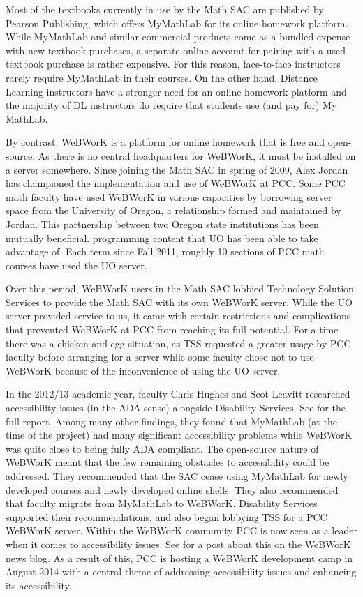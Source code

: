 Most of the textbooks currently in use by the Math SAC are published by Pearson
Publishing, which offers MyMathLab for its online homework platform. While
MyMathLab and similar commercial products come as a bundled expense with new
textbook purchases, a separate online account for pairing with a used textbook
purchase is rather expensive. For this reason, face-to-face instructors rarely
require MyMathLab in their courses. On the other hand, Distance Learning
instructors have a stronger need for an online homework platform and the
majority of DL instructors do require that students use (and pay for) My
MathLab.

By contrast, WeBWorK is a platform for online homework that is free and
open-source. As there is no central headquarters for WeBWorK, it must be
installed on a server somewhere. Since joining the Math SAC in spring of 2009,
Alex Jordan has championed the implementation and use of WeBWorK at PCC. Some
PCC math faculty have used WeBWorK in various capacities by borrowing server
space from the University of Oregon, a relationship formed and maintained by
Jordan. This partnership between two Oregon state institutions has been
mutually beneficial. %
programming content that UO has been able to take advantage of. Each term since
Fall 2011, roughly 10 sections of PCC math courses have used the UO server.

Over this period, WeBWorK users in the Math SAC lobbied Technology Solution
Services to provide the Math SAC with its own WeBWorK server. While the UO
server provided service to us, it came with certain restrictions and
complications that prevented WeBWorK at PCC from reaching its full potential.
For a time there was a chicken-and-egg situation, as TSS requested a greater
usage by PCC faculty before arranging for a server while some faculty chose not
to use WeBWorK because of the inconvenience of using the UO server.

In the 2012/13 academic year, faculty Chris Hughes and Scot Leavitt researched
accessibility issues (in the ADA sense) alongside Disability Services. See
\cite{accessibilityproject} for the full report. Among many other findings, they
found that MyMathLab (at the time of the project) had many significant
accessibility problems while WeBWorK was quite close to being fully ADA
compliant. The open-source nature of WeBWorK meant that the few remaining
obstacles to accessibility could be addressed. They recommended that the SAC
cease using MyMathLab for newly developed courses and newly developed online
shells. They also recommended that faculty migrate from MyMathLab to WeBWorK.
Disability Services supported their recommendations, and also began lobbying TSS
for a PCC WeBWorK server. Within the WeBWorK community PCC is now seen as a
leader when it comes to accessibility issues. See \cite{webworkblog} for a post
about this on the WeBWorK news blog. As a result of this, PCC is hosting a
WeBWorK development camp in August 2014 with a central theme of addressing
accessibility issues and enhancing its accessibility.\label{other:page:disabilityservices}

